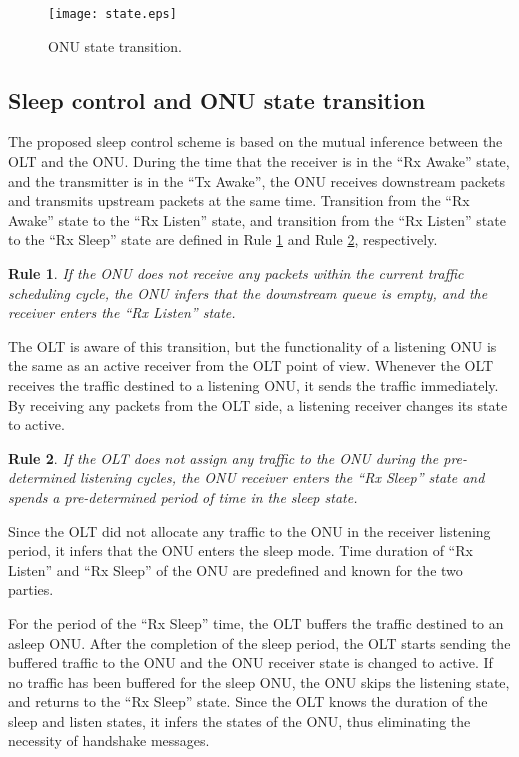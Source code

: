 \documentclass[11pt,english,12pt,onecolumn, draftcls]{IEEEtran}
\theoremstyle{plain}
\newtheorem{lem}{Rule}
\theoremstyle{definition}
\begin{document}
\begin{figure*}
\centering
\texttt{[image: state.eps]}
\caption{ONU state transition.}
\label{fig:State}
\end{figure*}

\subsection{Sleep control and ONU state transition}
\label{state}
The proposed sleep control scheme is based on the mutual inference between the OLT and the ONU. During the time that the receiver is in the ``Rx Awake'' state, and the transmitter is in the ``Tx Awake'', the ONU receives downstream packets and transmits upstream packets at the same time. Transition from the ``Rx Awake'' state to the ``Rx Listen'' state, and transition from the ``Rx Listen'' state to the ``Rx Sleep'' state are defined in Rule \ref{Lemma:1} and Rule \ref{Lemma:2}, respectively.

\begin{lem}
\label{Lemma:1}
If the ONU does not receive any packets within the current traffic scheduling cycle, the ONU infers that the downstream queue is empty, and the receiver enters the ``Rx Listen'' state.
\end{lem}

The OLT is aware of this transition, but the functionality of a listening ONU is the same as an active receiver from the OLT point of view.
Whenever the OLT receives the traffic destined to a listening ONU, it sends the traffic immediately. By receiving any packets from the OLT side, a listening receiver changes its state to active.

\begin{lem}
\label{Lemma:2}
If the OLT does not assign any traffic to the ONU during the pre-determined listening cycles, the ONU receiver enters the ``Rx Sleep'' state and spends a pre-determined period of time in the sleep state.
\end{lem}

Since the OLT did not allocate any traffic to the ONU in the receiver listening period, it infers that the ONU enters the sleep mode. Time duration of ``Rx Listen'' and ``Rx Sleep'' of the ONU are predefined and known for the two parties.

For the period of the ``Rx Sleep'' time, the OLT buffers the traffic destined to an asleep ONU. After the completion of the sleep period, the OLT starts sending the buffered traffic to the ONU and the ONU receiver state is changed to active. If no traffic has been buffered for the sleep ONU, the ONU skips the listening state, and returns to the ``Rx Sleep'' state. Since the OLT knows the duration of the sleep and listen states, it infers the states of the ONU, thus eliminating the necessity of handshake messages.
\end{document}
